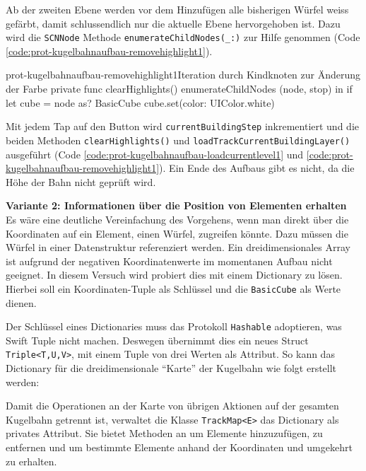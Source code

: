 \begin{description}
	Ab der zweiten Ebene werden vor dem Hinzufügen alle bisherigen Würfel weiss gefärbt, damit schlussendlich nur die aktuelle Ebene hervorgehoben ist. Dazu wird die \texttt{SCNNode} Methode \texttt{enumerateChildNodes(\_:)} zur Hilfe genommen (Code \ref{code:prot-kugelbahnaufbau-removehighlight1}).

	\begin{code}{prot-kugelbahnaufbau-removehighlight1}{Iteration durch Kindknoten zur Änderung der Farbe}
		private func clearHighlights() {
			enumerateChildNodes { (node, stop) in
				if let cube = node as? BasicCube {
					cube.set(color: UIColor.white)
				}
			}
		}
	\end{code}

	Mit jedem Tap auf den Button wird \texttt{currentBuildingStep} inkrementiert und die beiden Methoden \texttt{clearHighlights()} und \texttt{loadTrackCurrentBuildingLayer()} ausgeführt (Code \ref{code:prot-kugelbahnaufbau-loadcurrentlevel1} und \ref{code:prot-kugelbahnaufbau-removehighlight1}). Ein Ende des Aufbaus gibt es nicht, da die Höhe der Bahn nicht geprüft wird.

	\textbf{Variante 2: Informationen über die Position von Elementen erhalten}\\
	Es wäre eine deutliche Vereinfachung des Vorgehens, wenn man direkt über die Koordinaten auf ein Element, einen Würfel, zugreifen könnte. Dazu müssen die Würfel in einer Datenstruktur referenziert werden. Ein dreidimensionales Array ist aufgrund der negativen Koordinatenwerte im momentanen Aufbau nicht geeignet. In diesem Versuch wird probiert dies mit einem Dictionary zu lösen. Hierbei soll ein Koordinaten-Tuple als Schlüssel und die \texttt{BasicCube} als Werte dienen.
	
	Der Schlüssel eines Dictionaries muss das Protokoll \texttt{Hashable} adoptieren, was Swift Tuple nicht machen. Deswegen übernimmt dies ein neues Struct \texttt{Triple<T,U,V>}, mit einem Tuple von drei Werten als Attribut. So kann das Dictionary für die dreidimensionale "`Karte"' der Kugelbahn wie folgt erstellt werden:


	Damit die Operationen an der Karte von übrigen Aktionen auf der gesamten Kugelbahn getrennt ist, verwaltet die Klasse \texttt{TrackMap<E>} das Dictionary als privates Attribut. Sie bietet Methoden an um Elemente hinzuzufügen, zu entfernen und um bestimmte Elemente anhand der Koordinaten und umgekehrt zu erhalten.


\end{description}
